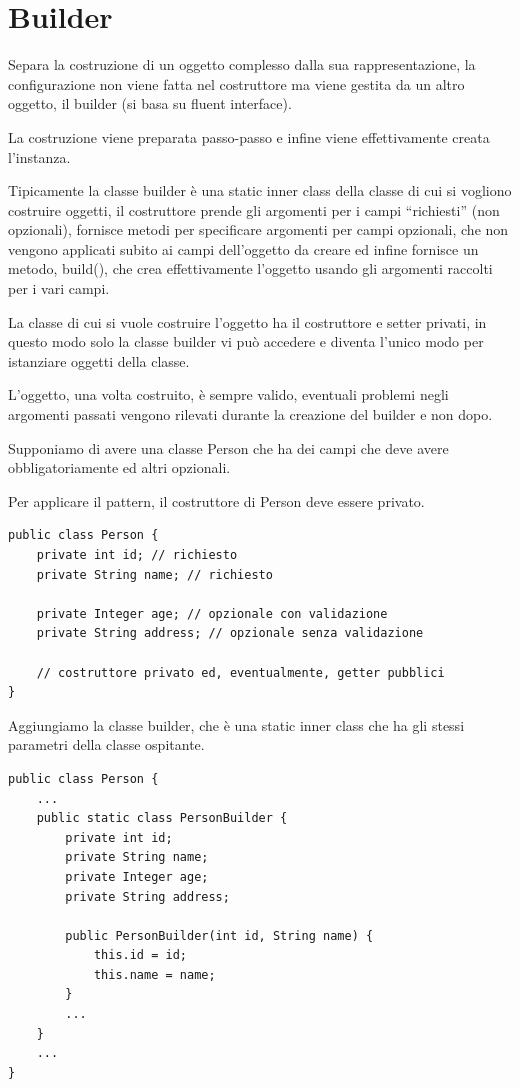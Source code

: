 \section{Builder}

Separa la costruzione di un oggetto complesso dalla sua rappresentazione, la configurazione non viene fatta nel costruttore ma viene gestita da un altro oggetto, 
il builder (si basa su fluent interface).

La costruzione viene preparata passo-passo e infine viene effettivamente creata l’instanza.

Tipicamente la classe builder è una static inner class della classe di cui si vogliono costruire oggetti, il costruttore prende gli argomenti per i campi “richiesti” 
(non opzionali), fornisce metodi per specificare argomenti per campi opzionali, che non vengono applicati subito ai campi dell’oggetto da creare ed infine fornisce un 
metodo, build(), che crea effettivamente l’oggetto usando gli argomenti raccolti per i vari campi.

La classe di cui si vuole costruire l'oggetto ha il costruttore e setter privati, in questo modo solo la classe builder vi può accedere e diventa l’unico modo per 
istanziare oggetti della classe.

L’oggetto, una volta costruito, è sempre valido, eventuali problemi negli argomenti passati vengono rilevati durante la creazione del builder e non dopo.

Supponiamo di avere una classe Person che ha dei campi che deve avere obbligatoriamente ed altri opzionali.

Per applicare il pattern, il costruttore di Person deve essere privato.

\begin{lstlisting}
public class Person {
    private int id; // richiesto
    private String name; // richiesto

    private Integer age; // opzionale con validazione
    private String address; // opzionale senza validazione

    // costruttore privato ed, eventualmente, getter pubblici
}
\end{lstlisting}

Aggiungiamo la classe builder, che è una static inner class che ha gli stessi parametri della classe ospitante.

\begin{lstlisting}
public class Person {
    ...
    public static class PersonBuilder {
        private int id;
        private String name;
        private Integer age;
        private String address;
        
        public PersonBuilder(int id, String name) {
            this.id = id;
            this.name = name;
        }
        ...
    }
    ...
}    
\end{lstlisting}

